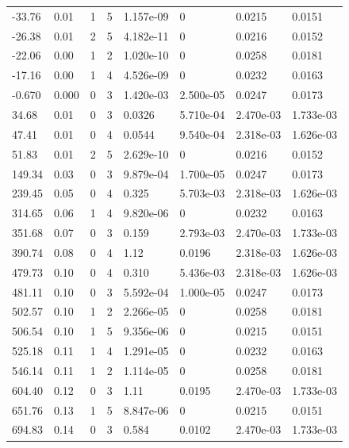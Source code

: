 \documentclass[preview]{standalone}
\begin{document}
{{\begin{tabular}{L{1.2cm}C{1.2cm} C{0.3cm}C{0.5cm} C{1.4cm}C{1.4cm} C{1.4cm}C{1.4cm}}
  -33.76  &  0.01  & 1     &  5 &  1.157e-09  & 0  & 0.0215 &  0.0151   \\ 
  -26.38  &  0.01  & 2     &  5 &  4.182e-11  & 0  & 0.0216 &  0.0152   \\ 
  -22.06  &  0.00  & 1     &  2 &  1.020e-10  & 0  & 0.0258 &  0.0181   \\ 
  -17.16  &  0.00  & 1     &  4 &  4.526e-09  & 0  & 0.0232 &  0.0163   \\ 
  -0.670  &  0.000  & 0     &  3 &  1.420e-03  & 2.500e-05  & 0.0247 &  0.0173   \\ 
  34.68  &  0.01  & 0     &  3 &  0.0326  & 5.710e-04  & 2.470e-03 &  1.733e-03   \\ 
  47.41  &  0.01  & 0     &  4 &  0.0544  & 9.540e-04  & 2.318e-03 &  1.626e-03   \\ 
  51.83  &  0.01  & 2     &  5 &  2.629e-10  & 0  & 0.0216 &  0.0152   \\ 
  149.34  &  0.03  & 0     &  3 &  9.879e-04  & 1.700e-05  & 0.0247 &  0.0173   \\ 
  239.45  &  0.05  & 0     &  4 &  0.325  & 5.703e-03  & 2.318e-03 &  1.626e-03   \\ 
  314.65  &  0.06  & 1     &  4 &  9.820e-06  & 0  & 0.0232 &  0.0163   \\ 
  351.68  &  0.07  & 0     &  3 &  0.159  & 2.793e-03  & 2.470e-03 &  1.733e-03   \\ 
  390.74  &  0.08  & 0     &  4 &  1.12  & 0.0196  & 2.318e-03 &  1.626e-03   \\ 
  479.73  &  0.10  & 0     &  4 &  0.310  & 5.436e-03  & 2.318e-03 &  1.626e-03   \\ 
  481.11  &  0.10  & 0     &  3 &  5.592e-04  & 1.000e-05  & 0.0247 &  0.0173   \\ 
  502.57  &  0.10  & 1     &  2 &  2.266e-05  & 0  & 0.0258 &  0.0181   \\ 
  506.54  &  0.10  & 1     &  5 &  9.356e-06  & 0  & 0.0215 &  0.0151   \\ 
  525.18  &  0.11  & 1     &  4 &  1.291e-05  & 0  & 0.0232 &  0.0163   \\ 
  546.14  &  0.11  & 1     &  2 &  1.114e-05  & 0  & 0.0258 &  0.0181   \\ 
  604.40  &  0.12  & 0     &  3 &  1.11  & 0.0195  & 2.470e-03 &  1.733e-03   \\ 
  651.76  &  0.13  & 1     &  5 &  8.847e-06  & 0  & 0.0215 &  0.0151   \\ 
  694.83  &  0.14  & 0     &  3 &  0.584  & 0.0102  & 2.470e-03 &  1.733e-03   \\ 

\end{tabular}}}
\end{document}
